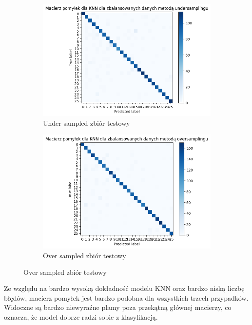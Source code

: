 \begin{figure}[H]
    \begin{subfigure}{0.5\textwidth}
        \centering
        \includegraphics[width=\textwidth]{img/confusion_under.png}
        \caption{Under sampled zbiór testowy}
        \label{fig:confusion_matrix_knn_under}
    \end{subfigure}
    \begin{subfigure}{0.49\textwidth}
        \centering
        \includegraphics[width=\textwidth]{img/confusion_over.png}
        \caption{Over sampled zbiór testowy}
        \label{fig:confusion_matrix_knn_over}
    \end{subfigure}
\end{figure}
Ze względu na bardzo wysoką dokładność modelu KNN oraz bardzo niską liczbę błędów, macierz pomyłek jest bardzo podobna dla wszystkich trzech przypadków.
Widoczne są bardzo niewyraźne plamy poza przekątną głównej macierzy, co oznacza, że model dobrze radzi sobie z klasyfikacją.
